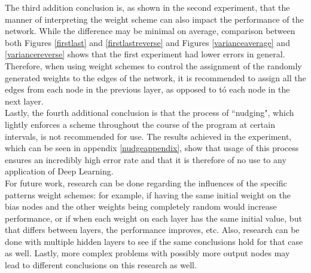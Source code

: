 \documentclass[a4paper, 10pt, notitlepage, twocolumn]{article}
\begin{document}
	 The third addition conclusion is, as shown in the second experiment, that the manner of interpreting the weight scheme can also impact the performance of the network. While the difference may be minimal on average, comparison between both Figures \ref{firstlast} and \ref{firstlastreverse} and Figures \ref{varianceaverage} and \ref{variancereverse} shows that the first experiment had lower errors in general. Therefore, when using weight schemes to control the assignment of the randomly generated weights to the edges of the network, it is recommended to assign all the edges from each node in the previous layer, as opposed to t\'o each node in the next layer.\\
	 Lastly, the fourth additional conclusion is that the process of ``nudging", which lightly enforces a scheme throughout the course of the program at certain intervals, is not recommended for use. The results achieved in the experiment, which can be seen in appendix \ref{nudgeappendix}, show that usage of this process ensures an incredibly high error rate and that it is therefore of no use to any application of Deep Learning.\\
	 For future work, research can be done regarding the influences of the specific patterns weight schemes: for example, if having the same initial weight on the bias nodes and the other weights being completely random would increase performance, or if when each weight on each layer has the same initial value, but that differs between layers, the performance improves, etc. Also, research can be done with multiple hidden layers to see if the same conclusions hold for that case as well. Lastly, more complex problems with possibly more output nodes may lead to different conclusions on this research as well.
 
\end{document}
